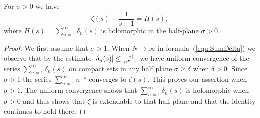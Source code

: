 \begin{corollary}\label{cor:ZetaCont}
	For $\sigma > 0$ we have
\begin{equation*}
	\zeta(s) - \frac{1}{s - 1} = H(s),
\end{equation*}
	where $H(s) = \sum _{n = 1} ^\infty \delta_n(s)$ is holomorphic in the half-plane $\sigma > 0$. 
\end{corollary}
\begin{proof}
	We first assume that $\sigma > 1$. When $N \to \infty$ in formula~(\ref{equ:SumDelta}) we observe that by the estimate $\left|\delta_n(s)\right| \leq \frac{\left|s\right|}{n^{\sigma + 1}}$ we have uniform convergence of the series $\sum _{n = 1} ^\infty \delta_n(s)$ on compact sets in any half plane $\sigma \geq \delta$ when $\delta > 0$. Since $\sigma > 1$ the series $\sum _{n = 1} ^{\infty} n^{-s}$ converges to $\zeta(s)$. This proves our assertion when $\sigma > 1$. The uniform convergence shows that $\sum _{n = 1} ^\infty \delta_n(s)$ is holomorphic when $\sigma > 0$ and thus shows that $\zeta$ is extendable to that half-plane and that the identity continues to hold there.
\end{proof}


